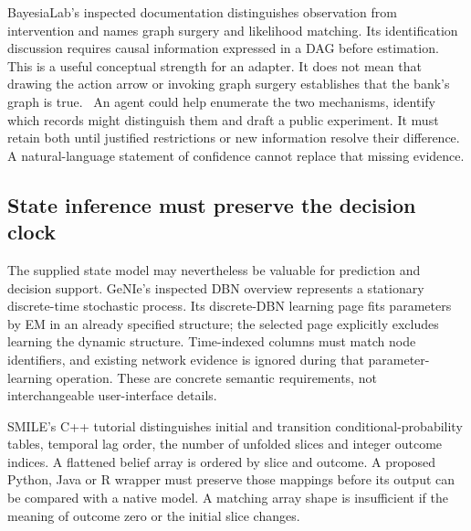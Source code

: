 BayesiaLab's inspected documentation distinguishes observation from intervention
and names graph surgery and likelihood matching. Its identification discussion
requires causal information expressed in a DAG before estimation. This is a
useful conceptual strength for an adapter. It does not mean that drawing the
action arrow or invoking graph surgery establishes that the bank's graph is
true.~\citep{exec13_ct_bayesia_inference,exec13_ct_bayesia_identification}
An agent could help enumerate the two mechanisms, identify which records might
distinguish them and draft a public experiment. It must retain both until justified
restrictions or new information resolve their difference. A natural-language
statement of confidence cannot replace that missing evidence.

\subsection{State inference must preserve the decision clock}
\label{exec22:state-clock}

The supplied state model may nevertheless be valuable for prediction and decision
support. GeNIe's inspected DBN overview represents a stationary discrete-time
stochastic process. Its discrete-DBN learning page fits parameters by EM in an
already specified structure; the selected page explicitly excludes learning the
dynamic structure. Time-indexed columns must match node identifiers, and existing
network evidence is ignored during that parameter-learning operation. These are
concrete semantic requirements, not interchangeable user-interface details.
\citep{exec13_ct_genie_dbn,exec13_ct_genie_learning}

SMILE's C++ tutorial distinguishes initial and transition conditional-probability
tables, temporal lag order, the number of unfolded slices and integer outcome
indices. A flattened belief array is ordered by slice and outcome. A proposed
Python, Java or R wrapper must preserve those mappings before its output can be
compared with a native model. A matching array shape is insufficient if the
meaning of outcome zero or the initial slice changes.
\citep{exec13_ct_smile_tutorial}

